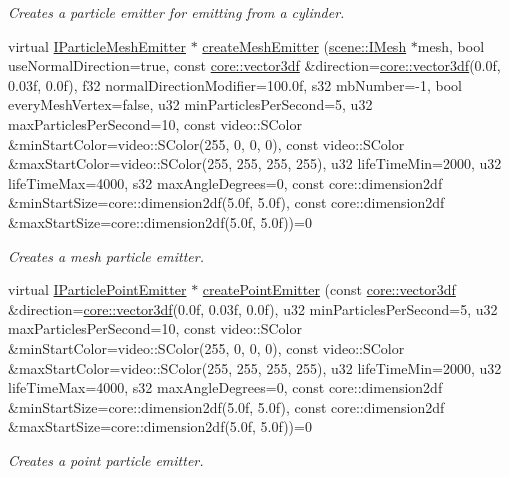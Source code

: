 \begin{DoxyCompactItemize}
\begin{DoxyCompactList}\small\item\em Creates a particle emitter for emitting from a cylinder. \end{DoxyCompactList}\item 
virtual \hyperlink{classirr_1_1scene_1_1IParticleMeshEmitter}{I\+Particle\+Mesh\+Emitter} $\ast$ \hyperlink{classirr_1_1scene_1_1IParticleSystemSceneNode_a7e08b7e74a5295fd167769d5ee5a5161}{create\+Mesh\+Emitter} (\hyperlink{classirr_1_1scene_1_1IMesh}{scene\+::\+I\+Mesh} $\ast$mesh, bool use\+Normal\+Direction=true, const \hyperlink{namespaceirr_1_1core_ae6e2b2a6c552833ebbd5b7463d03586b}{core\+::vector3df} \&direction=\hyperlink{namespaceirr_1_1core_ae6e2b2a6c552833ebbd5b7463d03586b}{core\+::vector3df}(0.\+0f, 0.\+03f, 0.\+0f), f32 normal\+Direction\+Modifier=100.\+0f, s32 mb\+Number=-\/1, bool every\+Mesh\+Vertex=false, u32 min\+Particles\+Per\+Second=5, u32 max\+Particles\+Per\+Second=10, const video\+::\+S\+Color \&min\+Start\+Color=video\+::\+S\+Color(255, 0, 0, 0), const video\+::\+S\+Color \&max\+Start\+Color=video\+::\+S\+Color(255, 255, 255, 255), u32 life\+Time\+Min=2000, u32 life\+Time\+Max=4000, s32 max\+Angle\+Degrees=0, const core\+::dimension2df \&min\+Start\+Size=core\+::dimension2df(5.\+0f, 5.\+0f), const core\+::dimension2df \&max\+Start\+Size=core\+::dimension2df(5.\+0f, 5.\+0f))=0
\begin{DoxyCompactList}\small\item\em Creates a mesh particle emitter. \end{DoxyCompactList}\item 
virtual \hyperlink{classirr_1_1scene_1_1IParticleEmitter}{I\+Particle\+Point\+Emitter} $\ast$ \hyperlink{classirr_1_1scene_1_1IParticleSystemSceneNode_a99e2549ad185f0c23b73f43869c60ab8}{create\+Point\+Emitter} (const \hyperlink{namespaceirr_1_1core_ae6e2b2a6c552833ebbd5b7463d03586b}{core\+::vector3df} \&direction=\hyperlink{namespaceirr_1_1core_ae6e2b2a6c552833ebbd5b7463d03586b}{core\+::vector3df}(0.\+0f, 0.\+03f, 0.\+0f), u32 min\+Particles\+Per\+Second=5, u32 max\+Particles\+Per\+Second=10, const video\+::\+S\+Color \&min\+Start\+Color=video\+::\+S\+Color(255, 0, 0, 0), const video\+::\+S\+Color \&max\+Start\+Color=video\+::\+S\+Color(255, 255, 255, 255), u32 life\+Time\+Min=2000, u32 life\+Time\+Max=4000, s32 max\+Angle\+Degrees=0, const core\+::dimension2df \&min\+Start\+Size=core\+::dimension2df(5.\+0f, 5.\+0f), const core\+::dimension2df \&max\+Start\+Size=core\+::dimension2df(5.\+0f, 5.\+0f))=0
\begin{DoxyCompactList}\small\item\em Creates a point particle emitter. \end{DoxyCompactList}\item 

\end{DoxyCompactItemize}
